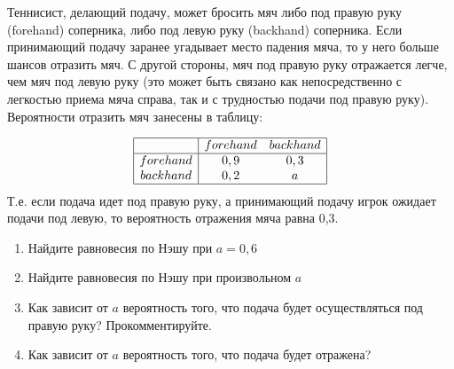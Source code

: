 \begin{problem} 
\begin{source}
\cite[4.18]{gintis:gte}
\end{source}
Теннисист, делающий подачу, может бросить мяч либо под правую руку (forehand) соперника, либо под левую руку (backhand) соперника. Если принимающий подачу заранее угадывает место падения мяча, то у него больше шансов отразить мяч. С другой стороны, мяч под правую руку отражается легче, чем мяч под левую руку (это может быть связано как непосредственно с легкостью приема мяча справа, так и с трудностью подачи под правую руку). Вероятности отразить мяч занесены в таблицу:\par
\[\begin{array}{|c|cc|}
\hline
{} & {forehand} & {backhand} \\
\hline {forehand} & {0,9} & {0,3} \\
{backhand} & {0,2} & {a} \\
\hline
\end{array}\]
Т.е. если подача идет под правую руку, а принимающий подачу игрок ожидает подачи под левую, то вероятность отражения мяча равна 0,3.
\begin{enumerate}
\item  Найдите равновесия по Нэшу при  $a=0,6$\par
\item Найдите равновесия по Нэшу при произвольном  $a$\par
\item  Как зависит от  $a$  вероятность того, что подача будет осуществляться под правую руку? Прокомментируйте.\par
\item Как зависит от  $a$  вероятность того, что подача будет отражена?\par
\end{enumerate}


\begin{sol}

\end{sol}
\end{problem}






